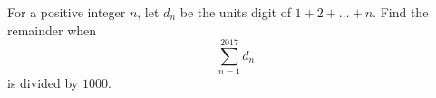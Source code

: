 For a positive integer $n$, let $d_n$ be the units digit of $1 + 2 + \dots + n$. Find the remainder when
\[\sum_{n=1}^{2017} d_n\]is divided by $1000$.